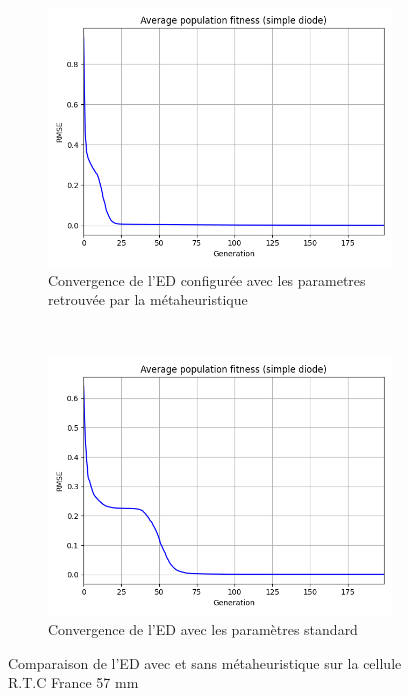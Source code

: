 \begin{figure}
    \centering
    \begin{subfigure}[b]{0.45\textwidth}
        \includegraphics[width=\textwidth]{resources/RTCFrance/metaconv.png}
        \caption{Convergence de l'ED configurée avec les parametres retrouvée par la métaheuristique}
    \end{subfigure}
    ~
    \begin{subfigure}[b]{0.45\textwidth}
        \includegraphics[width=\textwidth]{resources/RTCFrance/stdconv.png}
        \caption{Convergence de l'ED avec les paramètres standard}
    \end{subfigure}
    \caption{Comparaison de l'ED avec et sans métaheuristique sur la cellule R.T.C France 57 mm}
    \label{fig:metaconv2}
\end{figure}%
